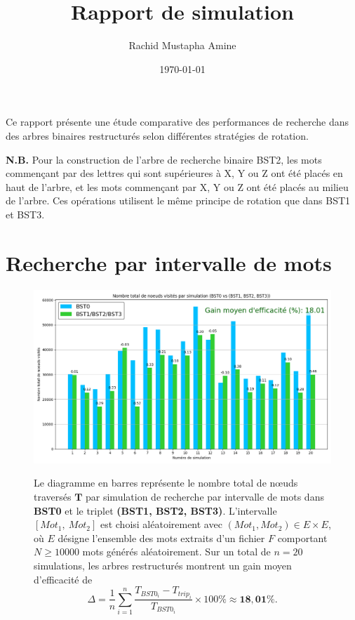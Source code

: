 \documentclass{article}
\title{Rapport de simulation}
\author{Rachid Mustapha Amine}
\date{\today}
\begin{document}
\small
Ce rapport présente une étude comparative des performances de recherche dans des arbres binaires restructurés selon différentes stratégies de rotation. 

\textbf{N.B.} Pour la construction de l'arbre de recherche binaire BST2, les mots commençant par des lettres qui sont supérieures à X, Y ou Z ont été placés en haut de l'arbre, et les mots commençant par X, Y ou Z ont été placés au milieu de l'arbre. Ces opérations utilisent le même principe de rotation que dans BST1 et BST3.

\section{Recherche par intervalle de mots}

\begin{figure}[h]
\centering
\begin{minipage}{0.56\textwidth}
	\includegraphics[width=\linewidth, scale=0.5]{rgs}
\end{minipage}
\begin{minipage}{0.4\textwidth}
\small
Le diagramme en barres représente le nombre total de nœuds traversés $\mathbf{T}$ par simulation de recherche par intervalle de mots dans \textbf{BST0} et le triplet \textbf{(BST1, BST2, BST3)}. L'intervalle $\left[\mathit{Mot}_1,\ \mathit{Mot}_2\right]$ est choisi aléatoirement avec $(\mathit{Mot}_1, \mathit{Mot}_2) \in \mathit{E} \times \mathit{E}$, où $\mathit{E}$ désigne l'ensemble des mots extraits d'un fichier $\mathit{F}$ comportant $N \geq 10000$ mots générés aléatoirement. Sur un total de $n = 20$ simulations, les arbres restructurés montrent un gain moyen d'efficacité de \[\Delta = \frac{1}{n} \sum_{i=1}^{n} \frac{T_{BST0_i} - T_{trip_i}}{T_{BST0_i}} \times 100\% \approx \mathbf{18{,}01\%}.\]
\end{minipage}
\end{figure}
\end{document}
